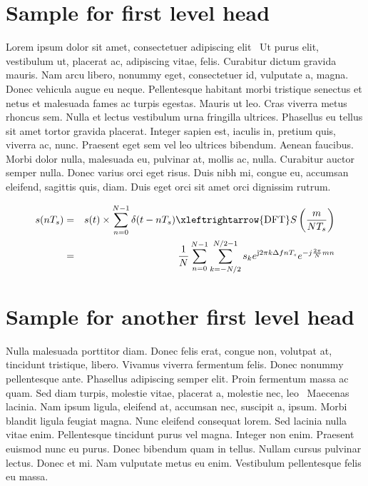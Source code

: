 \documentclass[APA,STIX1COL]{WileyNJD-v2}
\begin{document}


\section{Sample for first level head}\label{sec1}

Lorem ipsum dolor sit amet, consectetuer adipiscing elit~\citet{Rothermel1997} Ut purus elit, vestibulum ut, placerat ac, adipiscing vitae,
felis. Curabitur dictum gravida mauris. Nam arcu libero, nonummy eget, consectetuer id, vulputate a, magna. Donec
vehicula augue eu neque. Pellentesque habitant morbi tristique senectus et netus et malesuada fames ac turpis egestas.
Mauris ut leo. Cras viverra metus rhoncus sem. Nulla et lectus vestibulum urna fringilla ultrices. Phasellus eu tellus
sit amet tortor gravida placerat. Integer sapien est, iaculis in, pretium quis, viverra ac, nunc. Praesent eget sem vel
leo ultrices bibendum. Aenean faucibus. Morbi dolor nulla, malesuada eu, pulvinar at, mollis ac, nulla. Curabitur
auctor semper nulla. Donec varius orci eget risus. Duis nibh mi, congue eu, accumsan eleifend, sagittis quis, diam.
Duis eget orci sit amet orci dignissim rutrum.

\begin{eqnarray}
s(nT_{s}) &= &s(t)\times \sum\limits_{n=0}^{N-1} \delta (t-nT_{s}) \xleftrightarrow{\mathrm{DFT}}  S \left(\frac{m}{NT_{s}}\right) \nonumber\\
&= &\frac{1}{N} \sum\limits_{n=0}^{N-1} \sum\limits_{k=-N/2}^{N/2-1} s_{k} e^{\mathrm{j}2\pi k\Delta fnT_{s}} e^{-j\frac{2\pi}{N}mn}
\end{eqnarray}

\section{Sample for another first level head}\label{sec2}

Nulla malesuada porttitor diam. Donec felis erat, congue non, volutpat at, tincidunt tristique, libero. Vivamus viverra
fermentum felis. Donec nonummy pellentesque ante. Phasellus adipiscing semper elit. Proin fermentum massa ac
quam. Sed diam turpis, molestie vitae, placerat a, molestie nec, leo~\cite{Rothermel1998} Maecenas lacinia. Nam ipsum ligula, eleifend
at, accumsan nec, suscipit a, ipsum. Morbi blandit ligula feugiat magna. Nunc eleifend consequat lorem. Sed lacinia
nulla vitae enim. Pellentesque tincidunt purus vel magna. Integer non enim. Praesent euismod nunc eu purus. Donec
bibendum quam in tellus. Nullam cursus pulvinar lectus. Donec et mi. Nam vulputate metus eu enim. Vestibulum
pellentesque felis eu massa.
\end{document}
